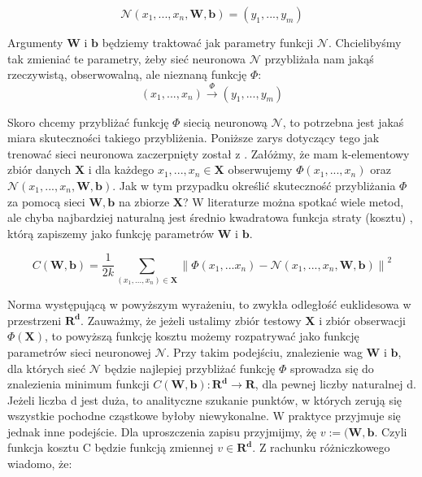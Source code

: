 \documentclass[licencjacka]{pracamgr}
\newcommand{\norm}[1]{\left\lVert#1\right\rVert}
\begin{document}
$$\mathcal{N}(x_{1},...,x_{n}, \mathbf{W}, \mathbf{b}) = (y_{1},...,y_{m})$$

Argumenty $\mathbf{W}$  i $\mathbf{b}$ będziemy traktować jak parametry funkcji $\mathbf{\mathcal{N}}$. Chcielibyśmy tak zmieniać te parametry, żeby sieć neuronowa $\mathbf{\mathcal{N}}$ przybliżała nam jakąś rzeczywistą, obserwowalną, ale nieznaną funkcję $\Phi$: 
$$ (x_{1},...,x_{n})\stackrel{\Phi}{\rightarrow}(y_{1},...,y_{m})$$

Skoro chcemy przybliżać funkcję $\Phi$ siecią neuronową $\mathbf{\mathcal{N}}$, to potrzebna jest jakaś miara skuteczności takiego przybliżenia. Poniższe zarys dotyczący tego jak trenować sieci neuronowa zaczerpnięty został z \cite{nn}. Załóżmy, że mam k-elementowy zbiór danych $\mathbf{X}$ i dla każdego $x_{1},...,x_{n}\in\mathbf{X}$ obserwujemy $\Phi(x_{1},...,x_{n})$ oraz $\mathbf{\mathcal{N}}(x_{1},...,x_{n}, \mathbf{W}, \mathbf{b})$. Jak w tym przypadku określić skuteczność przybliżania $\Phi$ za pomocą sieci $\mathbf{W}, \mathbf{b}$ na zbiorze $\mathbf{X}$? W literaturze można spotkać wiele metod, ale chyba najbardziej naturalną jest średnio kwadratowa funkcja straty (kosztu) , którą zapiszemy jako funkcję parametrów $\mathbf{W}$ i $\mathbf{b}$.
 
\begin{equation}
	\label{Cost_function}
	C(\mathbf{W}, \mathbf{b}) = \frac{1}{2k}\sum_{(x_{1},...,x_{n})\in\mathbf{X}}{\norm{\Phi(x_{1},...x_{n}) - \mathbf{\mathcal{N}}(x_{1},...,x_{n}, \mathbf{W}, \mathbf{b} )} } ^{2}
\end{equation}
 
 
Norma występującą w powyższym wyrażeniu, to zwykła odległość euklidesowa w przestrzeni $\mathbf{R^{d}}$. Zauważmy, że jeżeli ustalimy zbiór testowy $\mathbf{X}$ i zbiór obserwacji $\Phi(\mathbf{X})$, to powyższą funkcję kosztu możemy rozpatrywać jako funkcję parametrów sieci neuronowej $\mathbf{\mathcal{N}}$. Przy takim podejściu, znalezienie wag $\mathbf{W}$ i $\mathbf{b}$, dla których sieć $\mathbf{\mathcal{N}}$ będzie najlepiej przybliżać funkcję $\Phi$ sprowadza się do znalezienia minimum funkcji $C(\mathbf{W}, \mathbf{b}):\mathbf{R^{d}}\rightarrow\mathbf{R}$, dla pewnej liczby naturalnej d. Jeżeli liczba d jest duża, to analityczne szukanie punktów, w których zerują się wszystkie pochodne cząstkowe byłoby niewykonalne. W praktyce przyjmuje się jednak inne podejście. Dla uproszczenia zapisu przyjmijmy, żę $v:=(\mathbf{W}, \mathbf{b}$. Czyli funkcja kosztu C będzie funkcją zmiennej $v\in\mathbf{R^{d}}$. Z rachunku różniczkowego wiadomo, że:
 
\end{document}
